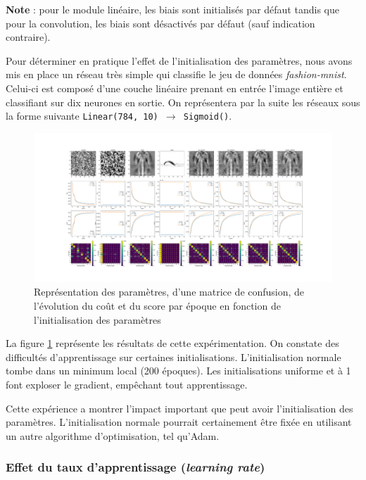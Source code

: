 \documentclass{article}
\begin{document}
\textbf{Note} : pour le module linéaire, les biais sont initialisés par défaut tandis que pour la convolution, les biais sont désactivés par défaut (sauf indication contraire).

Pour déterminer en pratique l'effet de l'initialisation des paramètres, nous avons mis en place un réseau très simple qui classifie le jeu de données \textit{fashion-mnist}. Celui-ci est composé d'une couche linéaire prenant en entrée l'image entière et classifiant sur dix neurones en sortie. On représentera par la suite les réseaux sous la forme suivante \texttt{Linear(784, 10) $ \rightarrow $ Sigmoid()}.

\begin{figure}[htbp]
    \centering
    \includegraphics[width=\textwidth]{init_type.pdf}
    \caption{Représentation des paramètres, d'une matrice de confusion, de l'évolution du coût et du score par époque en fonction de l'initialisation des paramètres}
    \label{fig:initparam}
\end{figure}

La figure \ref{fig:initparam} représente les résultats de cette expérimentation. On constate des difficultés d'apprentissage sur certaines initialisations. L'initialisation normale tombe dans un minimum local (200 époques). Les initialisations uniforme et à 1 font exploser le gradient, empêchant tout apprentissage. 

Cette expérience a montrer l'impact important que peut avoir l'initialisation des paramètres. L'initialisation normale pourrait certainement être fixée en utilisant un autre algorithme d'optimisation, tel qu'Adam.

\subsubsection{Effet du taux d'apprentissage (\textit{learning rate})}
\end{document}
